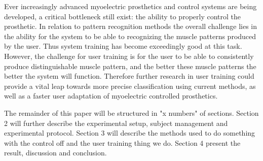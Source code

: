 
Ever increasingly advanced myoelectric prosthetics and control systems are being developed, a critical bottleneck still exist: the ability to properly control the prosthetic. In relation to pattern recognition methods the overall challenge lies in the ability for the system to be able to recognizing the muscle patterns produced by the user. Thus system training has become exceedingly good at this task. However, the challenge for user training is for the user to be able to consistently produce distinguishable muscle pattern, and the better these muscle patterns the better the system will function. \cite{Powell2014} Therefore further research in user training could provide a vital leap towards more precise classification using current methods, as well as a faster user adaptation of myoelectric controlled prosthetics. 


The remainder of this paper will be structured in "x numbers" of sections. Section 2 will further describe the experimental setup, subject management and experimental protocol. Section 3 will describe the methods used to do something with the control off and the user training thing we do. Section 4 present the result, discussion and conclusion. 

